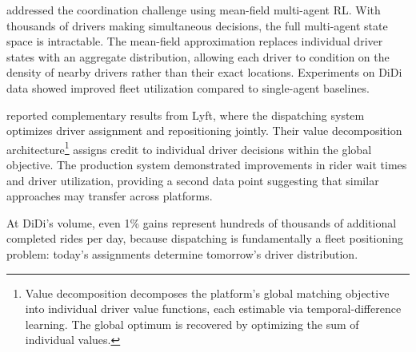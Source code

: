 \citet{Li2019ridesharing} addressed the coordination challenge using mean-field multi-agent RL. With thousands of drivers making simultaneous decisions, the full multi-agent state space is intractable. The mean-field approximation replaces individual driver states with an aggregate distribution, allowing each driver to condition on the density of nearby drivers rather than their exact locations. Experiments on DiDi data showed improved fleet utilization compared to single-agent baselines.

\citet{Han2022lyft} reported complementary results from Lyft, where the dispatching system optimizes driver assignment and repositioning jointly. Their value decomposition architecture\footnote{Value decomposition decomposes the platform's global matching objective into individual driver value functions, each estimable via temporal-difference learning. The global optimum is recovered by optimizing the sum of individual values.} assigns credit to individual driver decisions within the global objective. The production system demonstrated improvements in rider wait times and driver utilization, providing a second data point suggesting that similar approaches may transfer across platforms.

At DiDi's volume, even 1\% gains represent hundreds of thousands of additional completed rides per day, because dispatching is fundamentally a fleet positioning problem: today's assignments determine tomorrow's driver distribution.


